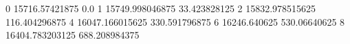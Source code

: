 0 15716.57421875 0.0
1 15749.998046875 33.423828125
2 15832.978515625 116.404296875
4 16047.166015625 330.591796875
6 16246.640625 530.06640625
8 16404.783203125 688.208984375
